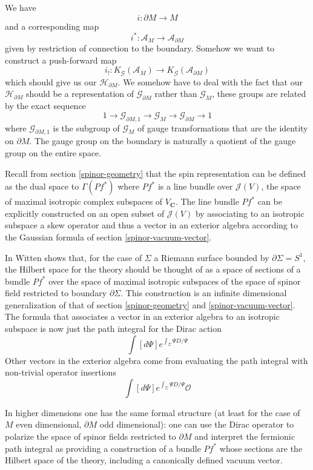 \documentclass[a4paper,a4paper]{article}
\theoremstyle{conjecture}
\def\Slash#1{#1\!\!\!\!/}
\def\Dirac{\Slash D}
\begin{document}
We have
$$i:\partial M\rightarrow M$$
and a corresponding map
$$i^*:{\mathcal A}_M\rightarrow {\mathcal A}_{\partial M}$$
given by restriction of connection to the boundary.  Somehow we want to construct a push-forward map
$$i_!:K_{\mathcal G}({\mathcal A}_M)\rightarrow K_{\mathcal G}({\mathcal A}_{\partial M})$$
which should give us our ${\mathcal H}_{\partial M}$. We somehow have to deal with the 
fact that our ${\mathcal H}_{\partial M}$ should be a representation of 
${\mathcal G}_{\partial M}$ rather than ${\mathcal G}_M$, these groups are related by the exact sequence
$$1\rightarrow {\mathcal G}_{\partial M,1}\rightarrow {\mathcal G}_M\rightarrow {\mathcal G}_{\partial M}\rightarrow 1$$
where ${\mathcal G}_{\partial M,1}$ is the subgroup of ${\mathcal G}_M$ of gauge transformations that are the identity
on $\partial M$. The gauge group on the boundary is naturally a quotient of the gauge group on the entire space.

Recall from section \ref{spinor-geometry} that the spin representation can be defined as the 
dual space to $\Gamma(Pf^*)$ where $Pf^*$ is a line bundle over $\mathcal J (V)$, the space of
maximal isotropic complex subspaces of $V_{\mathbf C}$.  The line bundle $Pf^*$ can be explicitly
constructed on an open subset of $\mathcal J (V)$ by associating to an isotropic subspace a
skew operator and thus a vector in an exterior algebra according to the Gaussian formula
of section \ref{spinor-vacuum-vector}.


In \cite{Witten2} Witten shows that, for the case of $\Sigma$ a Riemann surface bounded by
$\partial\Sigma =S^1$,  the Hilbert space for the theory should be thought of as a space of
sections of a bundle $Pf^*$ over the space of maximal isotropic subspaces of the space of
spinor field restricted to boundary $\partial \Sigma$.  This construction is an infinite
dimensional generalization of that of section \ref{spinor-geometry} and \ref{spinor-vacuum-vector}.
The formula that associates a vector in an exterior algebra to an isotropic subspace is now
just the path integral for the Dirac action
$$\int [d\Psi] e^{\int_\Sigma \Psi \Dirac \Psi}$$
Other vectors in the exterior algebra come from evaluating the path integral with non-trivial
operator insertions
$$\int [d\Psi] e^{\int_\Sigma \Psi \Dirac \Psi}\mathcal O$$

In higher dimensions one has the same formal structure (at least for the case of $M$ even
dimensional, $\partial M$ odd dimensional): one can use the Dirac operator to polarize the
space of spinor fields restricted to $\partial M$ and interpret the fermionic path integral
as providing a construction of a bundle $Pf^*$ whose sections are the Hilbert space of the
theory, including a canonically defined vacuum vector.
\end{document}
